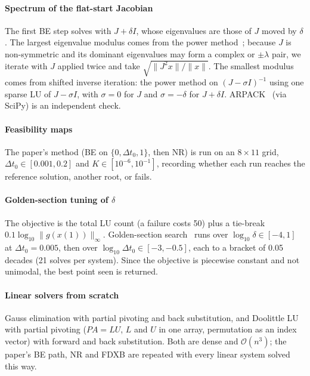 \documentclass[sigconf,nonacm]{acmart}
\newcommand{\norm}[1]{\lVert #1\rVert}
\newcommand{\ninf}[1]{\lVert #1\rVert_\infty}
\begin{document}
\paragraph{Spectrum of the flat-start Jacobian}
The first BE step solves with $J+\delta I$, whose eigenvalues are those of $J$ moved by $\delta$. The
largest eigenvalue modulus comes from the power method~\cite{golub2013}; because $J$ is non-symmetric and
its dominant eigenvalues may form a complex or $\pm\lambda$ pair, we iterate with $J$ applied twice and take
$\sqrt{\norm{J^2x}/\norm{x}}$. The smallest modulus comes from shifted inverse iteration: the power method on
$(J-\sigma I)^{-1}$ using one sparse LU of $J-\sigma I$, with $\sigma=0$ for $J$ and $\sigma=-\delta$ for
$J+\delta I$. ARPACK~\cite{arpack} (via SciPy) is an independent check.

\paragraph{Feasibility maps} The paper's method (BE on $\{0,\Delta t_0,1\}$, then NR) is run on an
$8\times11$ grid, $\Delta t_0\in[0.001,0.2]$ and $K\in[10^{-6},10^{-1}]$, recording whether each run reaches
the reference solution, another root, or fails.

\paragraph{Golden-section tuning of $\delta$} The objective is the total LU count (a failure costs 50)
plus a tie-break $0.1\log_{10}\ninf{g(x(1))}$. Golden-section search~\cite{kiefer1953} runs over
$\log_{10}\delta\in[-4,1]$ at $\Delta t_0=0.005$, then over $\log_{10}\Delta t_0\in[-3,-0.5]$, each to a
bracket of 0.05 decades (21 solves per system). Since the objective is piecewise constant and not unimodal,
the best point seen is returned.

\paragraph{Linear solvers from scratch} Gauss elimination with partial pivoting and back substitution,
and Doolittle LU with partial pivoting ($PA=LU$, $L$ and $U$ in one array, permutation as an index vector)
with forward and back substitution. Both are dense and $\mathcal{O}(n^3)$; the paper's BE path, NR and FDXB
are repeated with every linear system solved this way.

\end{document}
